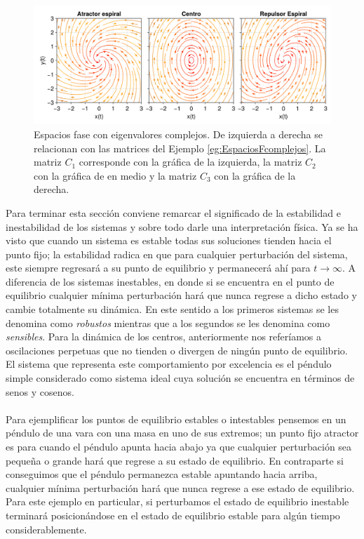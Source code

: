 \begin{ejemplo}
	\begin{figure}[h!]
		\centering
		\includegraphics[scale=0.23]{../../Imagenes/Espacios fase complejos}
		\caption{Espacios fase con eigenvalores complejos. De izquierda a derecha se relacionan con las matrices del Ejemplo \ref{eg:EspaciosFcomplejos}. La matriz $C_1$ corresponde con la gráfica de la izquierda, la matriz $C_2$ con la gráfica de en medio y la matriz $C_3$ con la gráfica de la derecha.}
		\label{fig:EFComplejos}
	\end{figure}
\end{ejemplo}
Para terminar esta sección conviene remarcar el significado de la estabilidad e inestabilidad de los sistemas y sobre todo darle una interpretación física. Ya se ha visto que cuando un sistema es estable todas sus soluciones tienden hacia el punto fijo; la estabilidad radica en que para cualquier perturbación del sistema, este siempre regresará a su punto de equilibrio y permanecerá ahí para $t\to\infty$. A diferencia de los sistemas inestables, en donde si se encuentra en el punto de equilibrio cualquier mínima perturbación hará que nunca regrese a dicho estado y cambie totalmente su dinámica. En este sentido a los primeros sistemas se les denomina como \textit{robustos} mientras que a los segundos se les denomina como \textit{sensibles}. Para la dinámica de los centros, anteriormente nos referíamos a oscilaciones perpetuas que no tienden o divergen de ningún punto de equilibrio. El sistema que representa este comportamiento por excelencia es el péndulo simple considerado como sistema ideal cuya solución se encuentra en términos de senos y cosenos. \\
\\
Para ejemplificar los puntos de equilibrio estables o intestables pensemos en un péndulo de una vara con una masa en uno de sus extremos; un punto fijo atractor es para cuando el péndulo apunta hacia abajo ya que cualquier perturbación sea pequeña o grande hará que regrese a su estado de equilibrio. En contraparte si conseguimos que el péndulo permanezca estable apuntando hacia arriba, cualquier mínima perturbación hará que nunca regrese a ese estado de equilibrio. Para este ejemplo en particular, si perturbamos el estado de equilibrio inestable terminará posicionándose en el estado de equilibrio estable para algún tiempo considerablemente.


